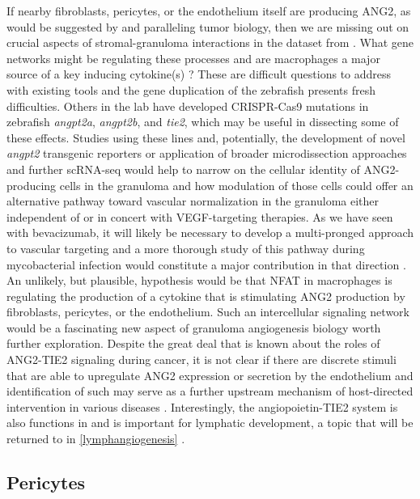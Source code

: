 If nearby fibroblasts, pericytes, or the endothelium itself are producing ANG2, as would be suggested by \citet{Gideon2022} and paralleling tumor biology, then we are missing out on crucial aspects of stromal\hyp{}granuloma interactions in the dataset from \citet{Cronan2021}. What gene networks might be regulating these processes and are macrophages a major source of a key inducing cytokine(s) \citep{Augustin2009}? These are difficult questions to address with existing tools and the gene duplication of the zebrafish presents fresh difficulties. Others in the lab have developed CRISPR\hyp{}Cas9 mutations in zebrafish \textit{angpt2a}, \textit{angpt2b}, and \textit{tie2}, which may be useful in dissecting some of these effects. Studies using these lines and, potentially, the development of novel \textit{angpt2} transgenic reporters or application of broader microdissection approaches and further scRNA\hyp{}seq would help to narrow on the cellular identity of ANG2\hyp{}producing cells in the granuloma and how modulation of those cells could offer an alternative pathway toward vascular normalization in the granuloma either independent of or in concert with VEGF\hyp{}targeting therapies. As we have seen with bevacizumab, it will likely be necessary to develop a multi\hyp{}pronged approach to vascular targeting and a more thorough study of this pathway during mycobacterial infection would constitute a major contribution in that direction \citep{Huang2010, Saharinen2017}. An unlikely, but plausible, hypothesis would be that NFAT in macrophages is regulating the production of a cytokine that is stimulating ANG2 production by fibroblasts, pericytes, or the endothelium. Such an intercellular signaling network would be a fascinating new aspect of granuloma angiogenesis biology worth further exploration. Despite the great deal that is known about the roles of ANG2\hyp{}TIE2 signaling during cancer, it is not clear if there are discrete stimuli that are able to upregulate ANG2 expression or secretion by the endothelium and identification of such may serve as a further upstream mechanism of host\hyp{}directed intervention in various diseases \citep{Huang2010}. Interestingly, the angiopoietin\hyp{}TIE2 system is also functions in and is important for lymphatic development, a topic that will be returned to in \autoref{lymphangiogenesis} \citep{Eklund2017}.

\subsection{Pericytes}\label{pericytes}

